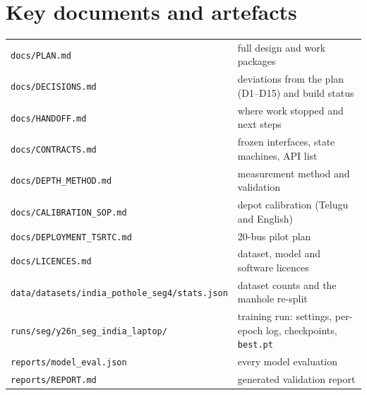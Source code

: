 \documentclass[11pt,a4paper]{article}
\newcommand{\code}[1]{\texttt{\small #1}}
\begin{document}
\section{Key documents and artefacts}
\begin{tabularx}{\textwidth}{@{}l X@{}}
\toprule
\code{docs/PLAN.md} & full design and work packages\\
\code{docs/DECISIONS.md} & deviations from the plan (D1--D15) and build status\\
\code{docs/HANDOFF.md} & where work stopped and next steps\\
\code{docs/CONTRACTS.md} & frozen interfaces, state machines, API list\\
\code{docs/DEPTH\_METHOD.md} & measurement method and validation\\
\code{docs/CALIBRATION\_SOP.md} & depot calibration (Telugu and English)\\
\code{docs/DEPLOYMENT\_TSRTC.md} & 20-bus pilot plan\\
\code{docs/LICENCES.md} & dataset, model and software licences\\
\code{data/datasets/india\_pothole\_seg4/stats.json} & dataset counts and the manhole re-split\\
\code{runs/seg/y26n\_seg\_india\_laptop/} & training run: settings, per-epoch log, checkpoints, \code{best.pt}\\
\code{reports/model\_eval.json} & every model evaluation\\
\code{reports/REPORT.md} & generated validation report\\
\bottomrule
\end{tabularx}
\end{document}
